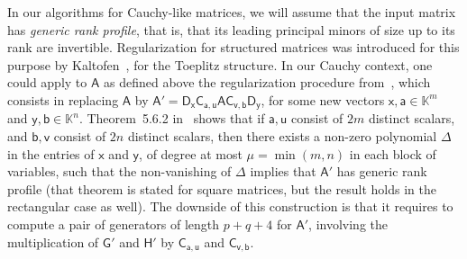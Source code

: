 \documentclass[sigconf]{acmart}
\newcommand{\va}{\ensuremath{\mathsf{a}}}
\newcommand{\vb}{\ensuremath{\mathsf{b}}}
\newcommand{\ve}{\ensuremath{\mathsf{e}}}
\newcommand{\vg}{\ensuremath{\mathsf{g}}}
\newcommand{\vh}{\ensuremath{\mathsf{h}}}
\newcommand{\vu}{\ensuremath{\mathsf{u}}}
\newcommand{\vv}{\ensuremath{\mathsf{v}}}
\newcommand{\vx}{\ensuremath{\mathsf{x}}}
\newcommand{\vy}{\ensuremath{\mathsf{y}}}
\newcommand{\mA}{\ensuremath{\mathsf{A}}}
\newcommand{\mC}{\ensuremath{\mathsf{C}}}
\newcommand{\mD}{\ensuremath{\mathsf{D}}}
\newcommand{\mG}{\ensuremath{\mathsf{G}}}
\newcommand{\mH}{\ensuremath{\mathsf{H}}}
\newcommand{\mT}{\ensuremath{\mathsf{T}}}
\newcommand{\mV}{\ensuremath{\mathsf{V}}}
\newcommand{\mW}{\ensuremath{\mathsf{W}}}
\newcommand{\mZ}{\ensuremath{\mathsf{Z}}}
\newcommand{\K}{\ensuremath{\mathbb{K}}}
\newcommand{\mn}{\ensuremath{\mu}}
\theoremstyle{acmdefinition}
\begin{document}

In our algorithms for
Cauchy-like matrices, we will assume that the input matrix has {\em
  generic rank profile}, that is, that its leading principal minors of
size up to its rank are invertible.  Regularization for structured
matrices was introduced for this purpose by
Kaltofen~\cite{Kaltofen94}, for the Toeplitz structure. In our Cauchy
context, one could apply to $\mA$ as defined above the regularization
procedure from~\cite[Section~5.6]{Pan01}, which consists in replacing
$\mA$ by $\mA' = \mD_\vx \mC_{\va,\vu} \mA \mC_{\vv,\vb}\mD_\vy$,
for some new vectors $\vx,\va \in \K^m$ and $\vy,\vb \in
\K^n$. Theorem~5.6.2 in~\cite{Pan01} shows that if $\va,\vu$ consist
of $2m$ distinct scalars, and $\vb,\vv$ consist of $2n$ distinct
scalars, then there exists a non-zero polynomial $\Delta$ in the
entries of $\vx$ and $\vy$, of degree at most $\mn=\min(m,n)$ in each
block of variables, such that the non-vanishing of $\Delta$ implies
that $\mA'$ has generic rank profile (that theorem is stated for
square matrices, but the result holds in the rectangular case as
well).  The downside of this construction is that it requires to
compute a pair of generators of length $p+q+4$ for $\mA'$, involving
the multiplication of $\mG'$ and $\mH'$ by $\mC_{\va,\vu}$ and
$\mC_{\vv,\vb}$.
\end{document}
